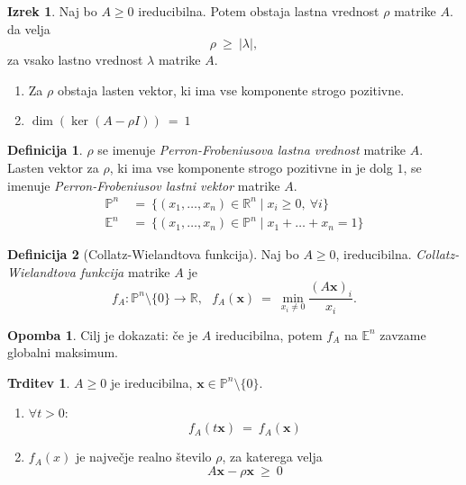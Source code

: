 \documentclass[11pt]{article}
\newcommand{\R}{\mathbb{R}}
\renewcommand{\P}{\mathbb{P}}
\newcommand{\E}{\mathbb{E}}
\newcommand{\x}{\mathbf{x}}
\newcommand{\0}{\mathbf{0}}
\theoremstyle{definition}
\newtheorem{definicija}{Definicija}[section]
\theoremstyle{definition}
\newtheorem{trditev}{Trditev}[section]
\theoremstyle{definition}
\newtheorem{izrek}{Izrek}[section]
\theoremstyle{definition}
\newtheorem*{opomba}{Opomba}
\begin{document}
\begin{izrek}

Naj bo $A \geq 0$ ireducibilna. Potem obstaja lastna vrednost $\rho$ matrike $A$. da velja
$$\rho ~\geq~ |\lambda|,$$
za vsako lastno vrednost $\lambda$ matrike $A$.
\begin{enumerate}
	\item Za $\rho$ obstaja lasten vektor, ki ima vse komponente strogo pozitivne.
	\item $\dim(\ker(A - \rho I)) ~=~ 1$
\end{enumerate}

\end{izrek}
\vspace{0.5cm}

\begin{definicija}

$\rho$ se imenuje \textit{Perron-Frobeniusova lastna vrednost} matrike $A$. Lasten vektor za $\rho$, ki ima vse komponente strogo pozitivne in je dolg $1$, se imenuje \textit{Perron-Frobeniusov lastni vektor} matrike $A$.
\begin{align*}
\P^n ~&=~ \{(x_1,\ldots,x_n) \in \R^n \mid x_i \geq 0, ~\forall i\} \\
\E^n ~&=~ \{(x_1,\ldots,x_n) \in \P^n \mid x_1 + \ldots + x_n = 1\}
\end{align*} 

\end{definicija}
\vspace{0.5cm}

\begin{definicija}[Collatz-Wielandtova funkcija]

Naj bo $A \geq 0$, ireducibilna. \textit{Collatz-Wielandtova funkcija} matrike $A$ je
$$f_A: \P^n \setminus \{0\} \rightarrow \R, ~~~f_A(\x) ~=~ \min_{x_i \neq 0} \frac{(A\x)_i}{x_i}.$$

\end{definicija}
\vspace{0.5cm}

\begin{opomba}

Cilj je dokazati: če je $A$ ireducibilna, potem $f_A$ na $\E^n$ zavzame globalni maksimum.

\end{opomba}
\vspace{0.5cm}

\begin{trditev}

$A \geq 0$ je ireducibilna, $\x \in \P^n \setminus \{0\}$.
\begin{enumerate}

\item $\forall t > 0$: 
$$f_A(t\x) ~=~ f_A(\x)$$

\item $f_A(x)$ je največje realno število $\rho$, za katerega velja
$$A\x - \rho\x ~\geq~ 0$$

\end{enumerate}

\end{trditev}
\vspace{0.5cm}
\end{document}

